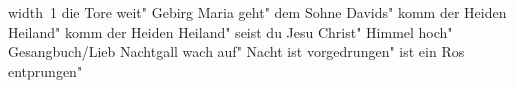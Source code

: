 \ifx\mxversion\undefined
  
  
  
  
\fi

%
\hbox{\pdfximage width 1\pdfrefximage\pdflastximage}\vfill\eject
\tableofcontents
\normalmusicsize
 die Tore weit"
 Gebirg Maria geht"
 dem Sohne Davids"
 komm der Heiden Heiland"
 komm der Heiden Heiland"
 seist du Jesu Christ"
 Himmel hoch"
 Gesangbuch/Lieb Nachtgall wach auf"
\makeatletter
{}
\makeatother
 Nacht ist vorgedrungen"
 ist ein Ros entprungen"
\bookbye